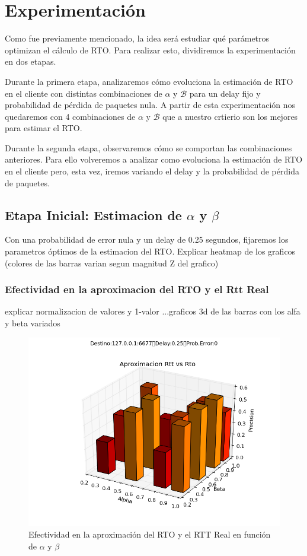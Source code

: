 \section{Experimentaci\'on}

Como fue previamente mencionado, la idea ser\'a estudiar qu\'e par\'ametros optimizan el c\'alculo de RTO. Para realizar esto, dividiremos la experimentaci\'on en dos etapas.

Durante la primera etapa, analizaremos c\'omo evoluciona la estimaci\'on de RTO en el cliente con distintas combinaciones de $\alpha$ y $\mathcal{B}$ para un delay fijo y probabilidad de p\'erdida de paquetes nula. A partir de esta experimentaci\'on nos quedaremos con 4 combinaciones de $\alpha$ y $\mathcal{B}$ que a nuestro crtierio son los mejores para estimar el RTO.

Durante la segunda etapa, observaremos c\'omo se comportan las combinaciones anteriores. Para ello volveremos a analizar como evoluciona la estimaci\'on de RTO en el cliente pero, esta vez, iremos variando el delay y la probabilidad de p\'erdida de paquetes. 

\subsection{Etapa Inicial: Estimacion de $\alpha$ y $\beta$}
Con una probabilidad de error nula y un delay de 0.25 segundos, fijaremos los parametros \'optimos de la estimacion del RTO.
Explicar heatmap de los graficos (colores de las barras varian segun magnitud Z del grafico)

\subsubsection{Efectividad en la aproximacion del RTO y el Rtt Real}
	explicar normalizacion de valores y 1-valor
	...graficos 3d de las barras con los alfa y beta variados

\begin{figure}[H]
  \centering	
	\includegraphics[scale=0.5]{../analisis/graficos_tablas/graficos_en_funcion_de_alfa_y_beta/graficos/rtt_vs_rto.png}
  \caption{Efectividad en la aproximaci\'on del RTO y el RTT Real en funci\'on de $\alpha$ y $\beta$}
	\label{fig:histo-src-sitiotrabajo}
\end{figure}

